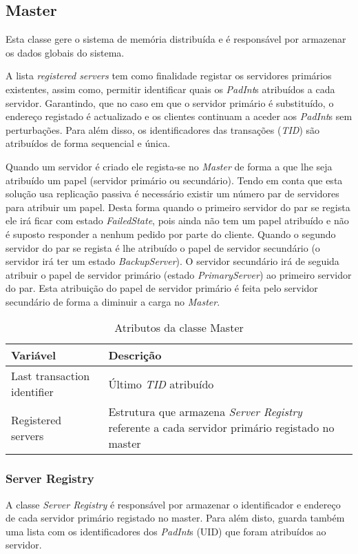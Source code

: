 \subsection{Master}

Esta classe gere o sistema de memória distribuída e é responsável por armazenar os dados globais do sistema.

A lista \textit{registered servers} tem como finalidade registar os servidores primários existentes, assim como, permitir identificar quais os \textit{PadInt}s atribuídos a cada servidor. Garantindo, que no caso em que o servidor primário é substituído, o endereço registado é actualizado e os clientes continuam a aceder aos \textit{PadInt}s sem perturbações. Para além disso, os identificadores das transações (\textit{TID}) são atribuídos de forma sequencial e única.

Quando um servidor é criado ele regista-se no \textit{Master} de forma a que lhe seja atribuído um papel (servidor primário ou secundário). Tendo em conta que esta solução usa replicação passiva é necessário existir um número par de servidores para atribuir um papel. Desta forma quando o primeiro servidor do par se regista ele irá ficar com estado \textit{FailedState}, pois ainda não tem um papel atribuído e não é suposto responder a nenhum pedido por parte do cliente. Quando o segundo servidor do par se regista é lhe atribuído o papel de servidor secundário (o servidor irá ter um estado \textit{BackupServer}). O servidor secundário irá de seguida atribuir o papel de servidor primário (estado \textit{PrimaryServer}) ao primeiro servidor do par. Esta atribuição do papel de servidor primário é feita pelo servidor secundário de forma a diminuir a carga no \textit{Master}.

\begin{table}[H]
\centering
\begin{tabular}{| p{2cm} | p{5cm} |}
\hline
\textbf{Variável} & \textbf{Descrição} \\
\hline
Last transaction
identifier & Último \textit{TID} atribuído \\
\hline
Registered
servers & Estrutura que armazena \textit{ Server Registry} referente a cada servidor primário registado no master \\
\hline
\end{tabular}
\caption{Atributos da classe Master}
\end{table}


\subsubsection{Server Registry}
A classe \textit{Server Registry} é responsável por armazenar o identificador e endereço de cada servidor primário registado no master. Para além disto, guarda também uma lista com os identificadores dos \textit{PadInt}s  (UID) que foram atribuídos ao servidor.

